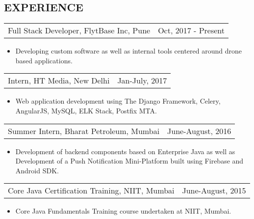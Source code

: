 \documentclass[margin]{res}
\begin{document}
\begin{resume}
\section{EXPERIENCE}      
                  \begin{tabular}{p{3in} r} %
                  Full Stack Developer, FlytBase Inc, Pune  & Oct, 2017 - Present
                  \end{tabular}	
                   \begin{itemize} %
                    \item[] Developing custom software as well as internal tools centered around drone based applications.
		   \end{itemize} 
		 \begin{tabular}{p{3in} r}
                  Intern, HT Media, New Delhi & Jan-July, 2017
                 \end{tabular}	
		  \begin{itemize}
                   \item[] Web application development using The Django Framework, Celery, AngularJS, MySQL, ELK Stack, Postfix MTA. 
                  \end{itemize}
                 \begin{tabular}{p{3in} r} %
                  Summer Intern, Bharat Petroleum, Mumbai &  June-August, 2016
                 \end{tabular}
                  \begin{itemize}
                   \item[] Development of backend components based on Enterprise Java as well as Development of a Push Notification Mini-Platform built using Firebase and Android SDK.
                  \end{itemize}
                 \begin{tabular}{p{3in} r} %
                  Core Java Certification Training, NIIT, Mumbai & June-August, 2015
                 \end{tabular}
                  \begin{itemize}
                   \item[] Core Java Fundamentals Training course undertaken at NIIT, Mumbai.
                  \end{itemize}


\end{resume}
\end{document}
